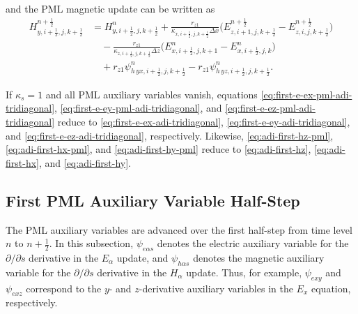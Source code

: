 \documentclass{article}
\numberwithin{equation}{section}
\numberwithin{figure}{section}
\begin{document}
and the PML magnetic update can be written as
\begin{equation}
    \begin{aligned}
        H_{y,i+\tfrac12,j,k+\tfrac12}^{n+\frac12}
         & = H_{y,i+\tfrac12,j,k+\tfrac12}^{n}
        +\frac{r_{z1}}{\kappa_{x,i+\tfrac12,j,k+\tfrac12}\Delta x}
        \Big(E_{z,i+1,j,k+\tfrac12}^{n+\frac12}-E_{z,i,j,k+\tfrac12}^{n+\frac12}\Big) \\
         & \quad
        -\frac{r_{z1}}{\kappa_{z,i+\tfrac12,j,k+\tfrac12}\Delta z}
        \Big(E_{x,i+\tfrac12,j,k+1}^{n}-E_{x,i+\tfrac12,j,k}^{n}\Big)                 \\
         & \quad
        +r_{z1}\psi^{n}_{h\,yx,i+\tfrac12,j,k+\tfrac12}
        -r_{z1}\psi^{n}_{h\,yz,i+\tfrac12,j,k+\tfrac12}.
    \end{aligned}
    \label{eq:adi-first-hy-pml}
\end{equation}

If $\kappa_s=1$ and all PML auxiliary variables vanish, equations \eqref{eq:first-e-ex-pml-adi-tridiagonal}, \eqref{eq:first-e-ey-pml-adi-tridiagonal}, and \eqref{eq:first-e-ez-pml-adi-tridiagonal} reduce to \eqref{eq:first-e-ex-adi-tridiagonal}, \eqref{eq:first-e-ey-adi-tridiagonal}, and \eqref{eq:first-e-ez-adi-tridiagonal}, respectively. Likewise, \eqref{eq:adi-first-hz-pml}, \eqref{eq:adi-first-hx-pml}, and \eqref{eq:adi-first-hy-pml} reduce to \eqref{eq:adi-first-hz}, \eqref{eq:adi-first-hx}, and \eqref{eq:adi-first-hy}.

\subsection{First PML Auxiliary Variable Half-Step}

The PML auxiliary variables are advanced over the first half-step from time level $n$ to $n+\tfrac12$. In this subsection, $\psi_{e\alpha s}$ denotes the electric auxiliary variable for the $\partial/\partial s$ derivative in the $E_\alpha$ update, and $\psi_{h\alpha s}$ denotes the magnetic auxiliary variable for the $\partial/\partial s$ derivative in the $H_\alpha$ update. Thus, for example, $\psi_{exy}$ and $\psi_{exz}$ correspond to the $y$- and $z$-derivative auxiliary variables in the $E_x$ equation, respectively.
\end{document}

